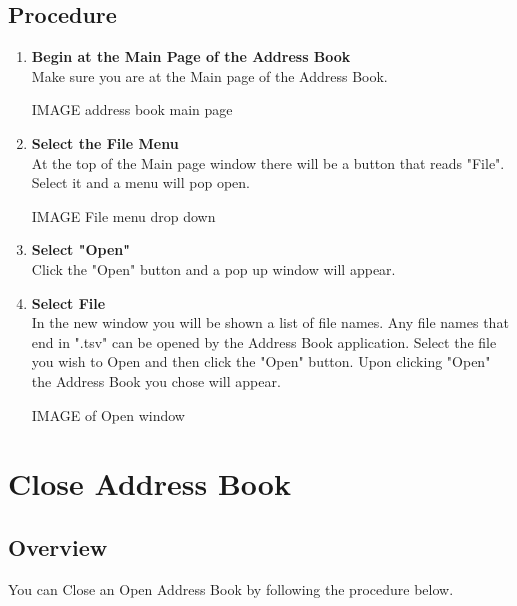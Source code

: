 \documentclass[a4paper, 11pt]{article}
\newlength{\drop}
\begin{document}
\subsection{Procedure}
\begin{enumerate}[label=\textbf{\arabic*})]
    \item{\textbf{Begin at the Main Page of the Address Book}}\\ Make sure you are at the Main page of the Address Book.
    
    IMAGE address book main page
    
    \item{\textbf{Select the File Menu}}\\ At the top of the Main page window there will be a button that reads "File". Select it and a menu will pop open.
    
    IMAGE File menu drop down  
    
    \item{\textbf{Select "Open"}}\\ Click the "Open" button and a pop up window will appear.
    
    \item{\textbf{Select File}}\\ In the new window you will be shown a list of file names. Any file names that end in ".tsv" can be opened by the Address Book application. Select the file you wish to Open and then click the "Open" button. Upon clicking "Open" the Address Book you chose will appear.
    
    IMAGE of Open window 
\end{enumerate}


\section{Close Address Book}
\subsection{Overview}
You can Close an Open Address Book by following the procedure below.
\end{document}
